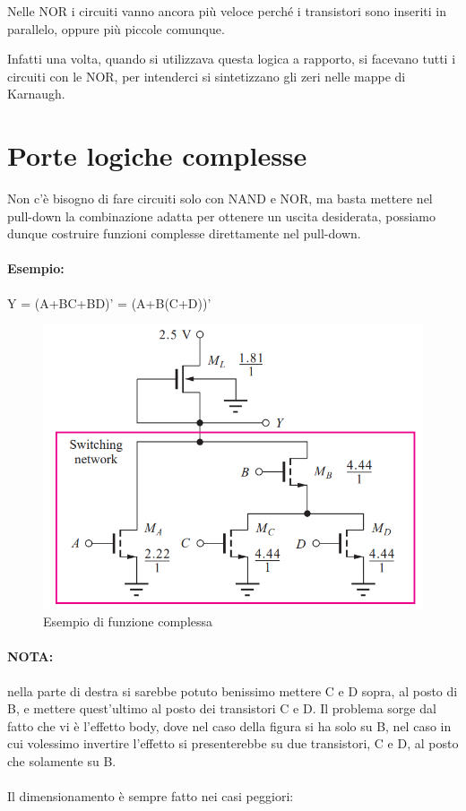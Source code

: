 Nelle NOR i circuiti vanno ancora più veloce perché i transistori sono inseriti in parallelo, oppure più piccole comunque.

Infatti una volta, quando si utilizzava questa logica a rapporto, si facevano tutti i circuiti con le NOR, per intenderci si sintetizzano gli zeri nelle mappe di Karnaugh.

\newpage
\section{Porte	logiche	complesse}

Non c'è bisogno di fare circuiti solo con NAND e NOR, ma basta mettere nel pull-down la combinazione adatta per ottenere un uscita desiderata, possiamo dunque costruire funzioni complesse direttamente nel pull-down.


\paragraph{Esempio: } Y = (A+BC+BD)' = (A+B(C+D))'

\begin{figure}[htbp]
    \centering
    \includegraphics[width=0.5\linewidth]{img/funz_coplesse.png}
    \caption{Esempio di funzione complessa}    
\end{figure}

\paragraph{NOTA:} nella parte di destra si sarebbe potuto benissimo mettere C e D sopra, al posto di B, e mettere quest'ultimo al posto dei transistori C e D. Il problema sorge dal fatto che vi è l'effetto body, dove nel caso della figura si ha solo su B, nel caso in cui volessimo invertire l'effetto si presenterebbe su due transistori, C e D, al posto che solamente su B.


\paragraph{}
Il dimensionamento è sempre fatto nei casi peggiori: 

